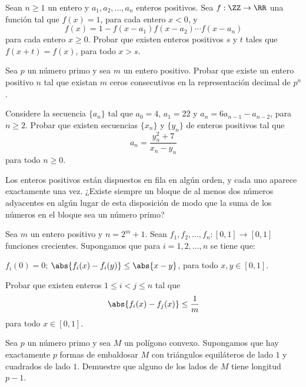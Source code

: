 
\begin{problem}
  Sean $n\ge 1$ un entero y $a_1,a_2,\dots,a_n$ enteros positivos. Sea
  $f:\ZZ\to\RR$ una función tal que $f(x)=1$, para cada entero $x<0$, y
  \[f(x)=1-f(x-a_1)f(x-a_2)\cdots f(x-a_n)\]
  para cada entero $x\ge 0$. Probar que existen enteros positivos $s$ y $t$
  tales que $f(x+t)=f(x)$, para todo $x>s$.
\end{problem}

\begin{problem}
  Sea $p$ un número primo y sea $m$ un entero positivo. Probar que existe un
  entero positivo $n$ tal que existan $m$ ceros consecutivos en la
  representación decimal de $p^n$.
\end{problem}

\begin{problem}
  Considere la secuencia $\{a_n\}$ tal que $a_0=4$, $a_1=22$ y
  $a_n=6a_{n-1}-a_{n-2}$, para $n\ge 2$. Probar que existen secuencias $\{x_n\}$
  y $\{y_n\}$ de enteros positivos tal que
  \[a_n=\frac{y_n^2+7}{x_n-y_n}\]
  para todo $n\ge 0$.
\end{problem}

\begin{problem}
  Los enteros positivos están dispuestos en fila en algún orden, y cada uno
  aparece exactamente una vez. ¿Existe siempre un bloque de al menos dos números
  adyacentes en algún lugar de esta disposición de modo que la suma de los
  números en el bloque sea un número primo?
\end{problem}

\begin{problem}
  Sea $m$ un entero positivo y $n=2^m+1$. Sean $f_1,f_2,\dots,f_n:[0,1]\to[0,1]$
  funciones crecientes. Supongamos que para $i=1,2,\dots,n$ se tiene que:
  \begin{enumerate}[(i)]
    \ii $f_i(0)=0$;
    \ii $\abs{f_i(x)-f_i(y)}\le\abs{x-y}$, para todo $x,y\in[0,1]$.
  \end{enumerate}
  Probar que existen enteros $1\le i<j\le n$ tal que
  \[\abs{f_i(x)-f_j(x)}\le\frac{1}{m}\]
  para todo $x\in[0,1]$.
\end{problem}

\begin{problem}
  Sea $p$ un número primo y sea $M$ un polígono convexo. Supongamos que hay
  exactamente $p$ formas de embaldosar $M$ con triángulos equiláteros de lado
  $1$ y cuadrados de lado $1$. Demuestre que alguno de los lados de $M$ tiene
  longitud $p-1$.
\end{problem}

